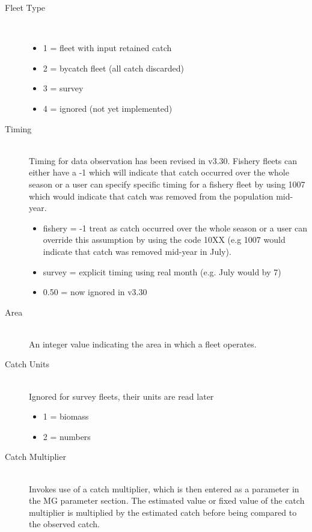 \begin{description}
  \item[Fleet Type] \ 
	  \begin{itemize}
	  	\item 1 = fleet with input retained catch
	  	\item 2 = bycatch fleet (all catch discarded)
	  	\item 3 = survey
	  	\item 4 = ignored (not yet implemented)
	  \end{itemize}
 \hypertarget{ObsTiming}{}
  \item[Timing]\hfill\\
   Timing for data observation has been revised in v3.30.  Fishery fleets can either have a -1 which will indicate that catch occurred over the whole season or a user can specify specific timing for a fishery fleet by using 1007 which would indicate that catch was removed from the population mid-year. %
	  \begin{itemize}
	  	\item fishery = -1 treat as catch occurred over the whole season or a user can override this assumption by using the code 10XX (e.g 1007 would indicate that catch was removed mid-year in July).
	  	\item survey = explicit timing using real month (e.g. July would by 7)
	  	\item 0.50 = now ignored in v3.30
	  \end{itemize}
  \item[Area]\hfill\\
  An integer value indicating the area in which a fleet operates.
  \item[Catch Units] \hfill\\
  Ignored for survey fleets, their units are read later
	  \begin{itemize}
	  	\item 1 = biomass
	  	\item 2 = numbers
	  \end{itemize}   
  \item[\hypertarget{CatchMult}{Catch Multiplier}] \hfill\\
  Invokes use of a catch multiplier, which is then entered as a parameter in the MG parameter section.  The estimated value or fixed value of the catch multiplier is multiplied by the estimated catch before being compared to the observed catch. 

\end{description}
